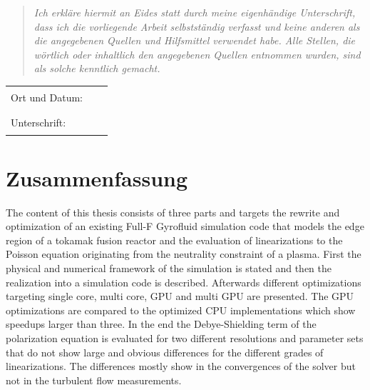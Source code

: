 \documentclass[12pt,oneside,bibtotoc,liststotoc]{scrbook}
\begin{document}
\begin{quote}
\emph{Ich erkläre hiermit an Eides statt durch meine eigenhändige Unterschrift, dass ich die vorliegende Arbeit selbstständig verfasst und keine anderen als die angegebenen Quellen und Hilfsmittel verwendet habe. Alle Stellen, die wörtlich oder inhaltlich den angegebenen Quellen entnommen wurden, sind als solche kenntlich gemacht.
}
\end{quote}
\vspace{2.5cm}

\begin{flushleft}
\begin{tabular}{lll}
Ort und Datum: & & \rule{7cm}{0.4pt}\\[7ex]
Unterschrift: & & \rule{7cm}{0.4pt}
\end{tabular}
\end{flushleft}

\thispagestyle{empty}

\setcounter{page}{1}

\chapter*{Zusammenfassung}
The content of this thesis consists of three parts and targets the rewrite and optimization of an existing Full-F Gyrofluid simulation code that models the edge region of a tokamak fusion reactor and the evaluation of linearizations to the Poisson equation originating from the neutrality constraint of a plasma. First the physical and numerical framework of the simulation is stated and then the realization into a simulation code is described. Afterwards different optimizations targeting single core, multi core, GPU and multi GPU are presented. The GPU optimizations are compared to the optimized CPU implementations which show speedups larger than three. In the end the Debye-Shielding term of the polarization equation is evaluated for two different resolutions and parameter sets that do not show large and obvious differences for the different grades of linearizations. The differences mostly show in the convergences of the solver but not in the turbulent flow measurements.
\end{document}
